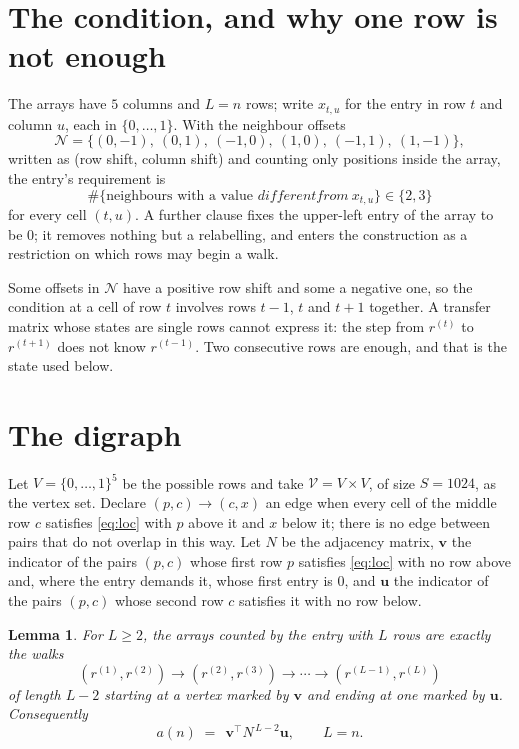 \documentclass[11pt,a4paper]{article}
\theoremstyle{plain}
\newtheorem{lemma}[theorem]{Lemma}
\theoremstyle{definition}
\begin{document}
\section{The condition, and why one row is not enough}

The arrays have $5$ columns and $L=n$ rows; write $x_{t,u}$ for the entry in
row $t$ and column $u$, each in $\{0,\dots,1\}$. With the neighbour offsets
\[
\mathcal N=\{(0,-1),\ (0,1),\ (-1,0),\ (1,0),\ (-1,1),\ (1,-1)\},
\]
written as (row shift, column shift) and counting only positions inside the array, the
entry's requirement is
\begin{equation}\label{eq:loc}
\#\{\text{neighbours with a value }different from\ x_{t,u}\}\in\{2,3\}
\end{equation}
for every cell $(t,u)$. A further clause fixes the upper-left entry of the array to be $0$; it removes nothing but a relabelling, and enters the construction as a restriction on which rows may begin a walk.

Some offsets in $\mathcal N$ have a positive row shift and some a negative one, so the
condition at a cell of row $t$ involves rows $t-1$, $t$ and $t+1$ together. A transfer
matrix whose states are single rows cannot express it: the step from $r^{(t)}$ to
$r^{(t+1)}$ does not know $r^{(t-1)}$. Two consecutive rows are enough, and that is
the state used below.

\section{The digraph}

Let $V=\{0,\dots,1\}^{5}$ be the possible rows and take
$\mathcal V=V\times V$, of size $S=1024$, as the vertex set. Declare $(p,c)\to(c,x)$ an edge
when every cell of the middle row $c$ satisfies \eqref{eq:loc} with $p$ above it and $x$
below it; there is no edge between pairs that do not overlap in this way. Let $N$ be the
adjacency matrix, $\mathbf{v}$ the indicator of the pairs $(p,c)$ whose first row $p$
satisfies \eqref{eq:loc} with no row above and, where the entry demands it, whose first entry is $0$, and $\mathbf{u}$ the indicator of
the pairs $(p,c)$ whose second row $c$ satisfies it with no row below.

\begin{lemma}\label{lem:walk}
For $L\ge2$, the arrays counted by the entry with $L$ rows are exactly the walks
\[
(r^{(1)},r^{(2)})\to(r^{(2)},r^{(3)})\to\cdots\to(r^{(L-1)},r^{(L)})
\]
of length $L-2$ starting at a vertex marked by $\mathbf{v}$ and ending at one marked by
$\mathbf{u}$. Consequently
\[
a(n)\;=\;\,\mathbf{v}^{\!\top}N^{\,L-2}\mathbf{u},\qquad L=n .
\]
\end{lemma}
\end{document}
